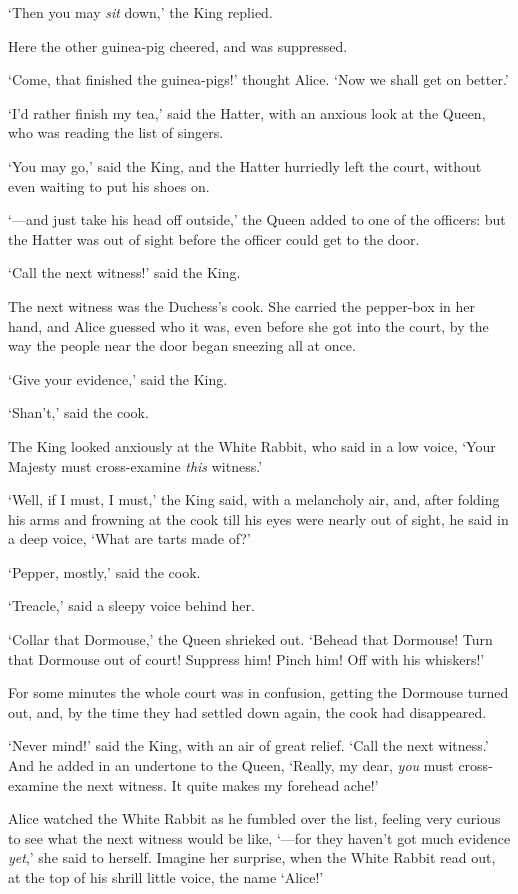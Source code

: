 \documentclass[12pt,openany]{memoir}
\begin{document}
`Then you may \textit{sit} down,' the King replied.

Here the other guinea-pig cheered, and was suppressed.

`Come, that finished the guinea-pigs!' thought Alice. `Now we shall get on better.'

`I'd rather finish my tea,' said the Hatter, with an anxious look at the Queen, who was reading the list of singers.

`You may go,' said the King, and the Hatter hurriedly left the court, without even waiting to put his shoes on.

`---and just take his head off outside,' the Queen added to one of the officers: but the Hatter was out of sight before the officer could get to the door.

`Call the next witness!' said the King.

The next witness was the Duchess's cook. She carried the pepper-box in her hand, and Alice guessed who it was, even before she got into the court, by the way the people near the door began sneezing all at once.

`Give your evidence,' said the King.

`Shan't,' said the cook.

The King looked anxiously at the White Rabbit, who said in a low voice, `Your Majesty must cross-examine \textit{this} witness.'

`Well, if I must, I must,' the King said, with a melancholy air, and, after folding his arms and frowning at the cook till his eyes were nearly out of sight, he said in a deep voice, `What are tarts made of?'

`Pepper, mostly,' said the cook.

`Treacle,' said a sleepy voice behind her.

`Collar that Dormouse,' the Queen shrieked out. `Behead that Dormouse! Turn that Dormouse out of court! Suppress him! Pinch him! Off with his whiskers!'

For some minutes the whole court was in confusion, getting the Dormouse turned out, and, by the time they had settled down again, the cook had disappeared.

`Never mind!' said the King, with an air of great relief. `Call the next witness.' And he added in an undertone to the Queen, `Really, my dear, \textit{you} must cross-examine the next witness. It quite makes my forehead ache!'

Alice watched the White Rabbit as he fumbled over the list, feeling very curious to see what the next witness would be like, `---for they haven't got much evidence \textit{yet},' she said to herself. Imagine her surprise, when the White Rabbit read out, at the top of his shrill little voice, the name `Alice!'
\end{document}
